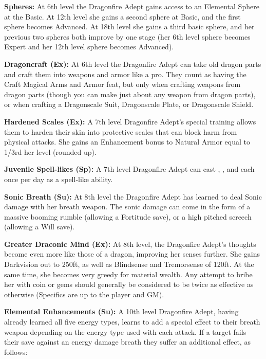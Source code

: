 \textbf{Spheres:} At 6th level the Dragonfire Adept gains access to an Elemental Sphere at the Basic. At 12th level she gains a second sphere at Basic, and the first sphere becomes Advanced. At 18th level she gains a third basic sphere, and her previous two spheres both improve by one stage (her 6th level sphere becomes Expert and her 12th level sphere becomes Advanced).

\textbf{Dragoncraft (Ex):} At 6th level the Dragonfire Adept can take old dragon parts and craft them into weapons and armor like a pro. They count as having the Craft Magical Arms and Armor feat, but only when crafting weapons from dragon parts (though you can make just about any weapon from dragon parts), or when crafting a Dragonscale Suit, Dragonscale Plate, or Dragonscale Shield.

\textbf{Hardened Scales (Ex):} A 7th level Dragonfire Adept's special training allows them to harden their skin into protective scales that can block harm from physical attacks. She gains an Enhancement bonus to Natural Armor equal to 1/3rd her level (rounded up).

\textbf{Juvenile Spell-likes (Sp):} A 7th level Dragonfire Adept can cast , , and  each once per day as a spell-like ability.

\textbf{Sonic Breath (Su):} At 8th level the Dragonfire Adept has learned to deal Sonic damage with her breath weapon. The sonic damage can come in the form of a massive booming rumble (allowing a Fortitude save), or a high pitched screech (allowing a Will save).

\textbf{Greater Draconic Mind (Ex):} At 8th level, the Dragonfire Adept's thoughts become even more like those of a dragon, improving her senses further. She gains Darkvision out to 250ft, as well as Blindsense and Tremorsense of 120ft. At the same time, she becomes very greedy for material wealth. Any attempt to bribe her with coin or gems should generally be considered to be twice as effective as otherwise (Specifics are up to the player and GM).

\textbf{Elemental Enhancements (Su):} A 10th level Dragonfire Adept, having already learned all five energy types, learns to add a special effect to their breath weapon depending on the energy type used with each attack. If a target fails their save against an energy damage breath they suffer an additional effect, as follows:

